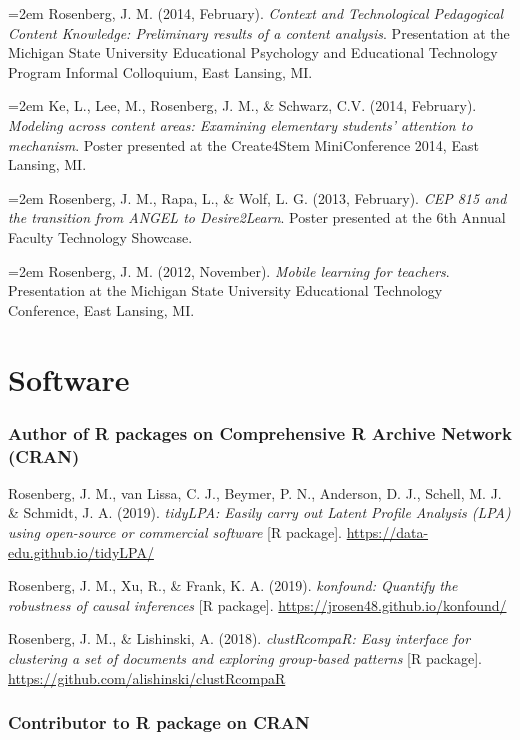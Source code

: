 \documentclass[
  14,
]{article}
\begin{document}
\hangindent=2em Rosenberg, J. M. (2014, February). \emph{Context and
Technological Pedagogical Content Knowledge: Preliminary results of a
content analysis}. Presentation at the Michigan State University
Educational Psychology and Educational Technology Program Informal
Colloquium, East Lansing, MI.

\hangindent=2em Ke, L., Lee, M., Rosenberg, J. M., \& Schwarz, C.V.
(2014, February). \emph{Modeling across content areas: Examining
elementary students' attention to mechanism}. Poster presented at the
Create4Stem MiniConference 2014, East Lansing, MI.

\hangindent=2em Rosenberg, J. M., Rapa, L., \& Wolf, L. G. (2013,
February). \emph{CEP 815 and the transition from ANGEL to Desire2Learn}.
Poster presented at the 6th Annual Faculty Technology Showcase.

\hangindent=2em Rosenberg, J. M. (2012, November). \emph{Mobile learning
for teachers}. Presentation at the Michigan State University Educational
Technology Conference, East Lansing, MI.

\hypertarget{software}{%
\section{Software}\label{software}}

\hypertarget{author-of-r-packages-on-comprehensive-r-archive-network-cran}{%
\subsubsection{Author of R packages on Comprehensive R Archive Network
(CRAN)}\label{author-of-r-packages-on-comprehensive-r-archive-network-cran}}

Rosenberg, J. M., van Lissa, C. J., Beymer, P. N., Anderson, D. J.,
Schell, M. J. \& Schmidt, J. A. (2019). \emph{tidyLPA: Easily carry out
Latent Profile Analysis (LPA) using open-source or commercial software}
{[}R package{]}. \url{https://data-edu.github.io/tidyLPA/}

Rosenberg, J. M., Xu, R., \& Frank, K. A. (2019). \emph{konfound:
Quantify the robustness of causal inferences} {[}R package{]}.
\url{https://jrosen48.github.io/konfound/}

Rosenberg, J. M., \& Lishinski, A. (2018). \emph{clustRcompaR: Easy
interface for clustering a set of documents and exploring group-based
patterns} {[}R package{]}.
\url{https://github.com/alishinski/clustRcompaR}

\hypertarget{contributor-to-r-package-on-cran}{%
\subsubsection{Contributor to R package on
CRAN}\label{contributor-to-r-package-on-cran}}
\end{document}
